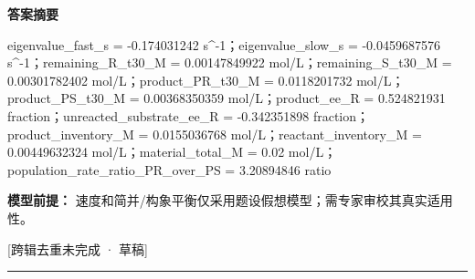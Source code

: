 \documentclass[UTF8,11pt,a4paper]{ctexart}
\begin{document}
\noindent\textbf{答案摘要}\par
eigenvalue\_fast\_s = -0.174031242 s\textasciicircum{}-1；eigenvalue\_slow\_s = -0.0459687576 s\textasciicircum{}-1；remaining\_R\_t30\_M = 0.00147849922 mol/L；remaining\_S\_t30\_M = 0.00301782402 mol/L；product\_PR\_t30\_M = 0.0118201732 mol/L；product\_PS\_t30\_M = 0.00368350359 mol/L；product\_ee\_R = 0.524821931 fraction；unreacted\_substrate\_ee\_R = -0.342351898 fraction；product\_inventory\_M = 0.0155036768 mol/L；reactant\_inventory\_M = 0.00449632324 mol/L；material\_total\_M = 0.02 mol/L；population\_rate\_ratio\_PR\_over\_PS = 3.20894846 ratio\par
\noindent\textbf{模型前提：}
速度和简并/构象平衡仅采用题设假想模型；需专家审校其真实适用性。\par
\noindent\textcolor{red!65!black}{[跨辑去重未完成 · 草稿]} \par
\medskip\hrule\medskip
{}
\end{document}
